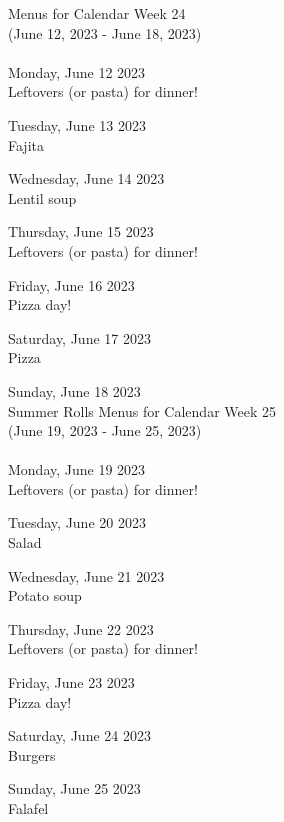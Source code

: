 \documentclass[12pt, parskip=full*]{scrreprt}
\begin{document}
\begin{center}{\Large Menus for Calendar Week 24} \\ 
{\small (June 12, 2023 - June 18, 2023)}\\ 
 ~ \\{\calligra \Large Monday, June 12 2023} \\ 
Leftovers (or pasta) for dinner!

{\calligra \Large Tuesday, June 13 2023} \\ 
Fajita

{\calligra \Large Wednesday, June 14 2023} \\ 
Lentil soup

{\calligra \Large Thursday, June 15 2023} \\ 
Leftovers (or pasta) for dinner!

{\calligra \Large Friday, June 16 2023} \\ 
Pizza day!

{\calligra \Large Saturday, June 17 2023} \\ 
Pizza

{\calligra \Large Sunday, June 18 2023} \\ 
Summer Rolls
\newpage
{\Large Menus for Calendar Week 25} \\ 
{\small (June 19, 2023 - June 25, 2023)}\\ 
 ~ \\{\calligra \Large Monday, June 19 2023} \\ 
Leftovers (or pasta) for dinner!

{\calligra \Large Tuesday, June 20 2023} \\ 
Salad

{\calligra \Large Wednesday, June 21 2023} \\ 
Potato soup

{\calligra \Large Thursday, June 22 2023} \\ 
Leftovers (or pasta) for dinner!

{\calligra \Large Friday, June 23 2023} \\ 
Pizza day!

{\calligra \Large Saturday, June 24 2023} \\ 
Burgers

{\calligra \Large Sunday, June 25 2023} \\ 
Falafel
\end{center}
\end{document}
